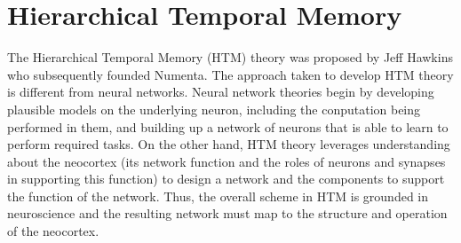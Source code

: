 \chapter{Hierarchical Temporal Memory}

The Hierarchical Temporal Memory (HTM) \cite{George2009} theory was proposed by Jeff Hawkins who subsequently founded Numenta. The approach taken to develop HTM theory is different from neural networks. Neural network theories begin by developing plausible models on the underlying neuron, including the conputation being performed in them, and building up a network of neurons that is able to learn to perform required tasks. On the other hand, HTM theory leverages understanding about the neocortex (its network function and the roles of neurons and synapses in supporting this function) to design a network and the components to support the function of the network. Thus, the overall scheme in HTM is grounded in neuroscience and the resulting network must map to the structure and operation of the neocortex.

